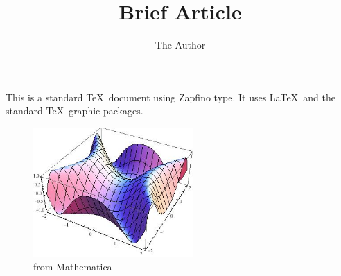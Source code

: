 \documentclass[12pt]{article}
\title{Brief Article}
\author{The Author}
\begin{document}
\maketitle

This is a standard \TeX\ document using Zapfino type. It uses \LaTeX\ and
the standard \TeX\ graphic packages.

\begin{figure}[htbp] 
   \centering
   \includegraphics[width=2.4in]{XeTeX-2-graph.png} 
   \caption{from Mathematica}
\end{figure}
\end{document}
